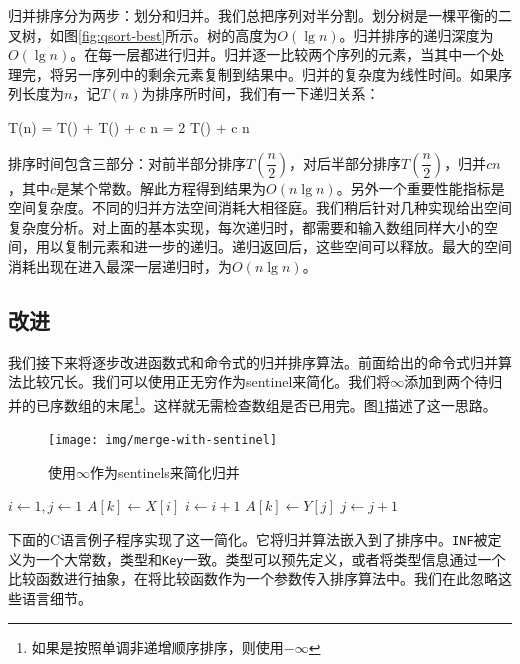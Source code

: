 \documentclass[b5paper]{ctexart}
\begin{document}
归并排序分为两步：划分和归并。我们总把序列对半分割。划分树是一棵平衡的二叉树，如图\ref{fig:qsort-best}所示。树的高度为$O(\lg n)$。归并排序的递归深度为$O(\lg n)$。在每一层都进行归并。归并逐一比较两个序列的元素，当其中一个处理完，将另一序列中的剩余元素复制到结果中。归并的复杂度为线性时间。如果序列长度为$n$，记$T(n)$为排序所时间，我们有一下递归关系：

\be
T(n) = T() + T() + c n = 2 T() + c n
\ee

排序时间包含三部分：对前半部分排序$T(\dfrac{n}{2})$，对后半部分排序$T(\dfrac{n}{2})$，归并$c n$，其中$c$是某个常数。解此方程得到结果为$O(n \lg n)$。另外一个重要性能指标是空间复杂度。不同的归并方法空间消耗大相径庭。我们稍后针对几种实现给出空间复杂度分析。对上面的基本实现，每次递归时，都需要和输入数组同样大小的空间，用以复制元素和进一步的递归。递归返回后，这些空间可以释放。最大的空间消耗出现在进入最深一层递归时，为$O(n \lg n)$。

\subsection{改进}

我们接下来将逐步改进函数式和命令式的归并排序算法。前面给出的命令式归并算法比较冗长。我们可以使用正无穷作为sentinel来简化\cite{CLRS}。我们将$\infty$添加到两个待归并的已序数组的末尾\footnote{如果是按照单调非递增顺序排序，则使用$-\infty$}。这样就无需检查数组是否已用完。图\ref{fig:merge-with-sentinel}描述了这一思路。

\begin{figure}[htbp]
 \centering
 \texttt{[image: img/merge-with-sentinel]}
 \caption{使用$\infty$作为sentinels来简化归并}
 \label{fig:merge-with-sentinel}
\end{figure}

\begin{algorithmic}[1]
  \State {}
  \State {}
  \State $i \gets 1, j\gets 1$
      \State $A[k] \gets X[i]$
      \State $i \gets i + 1$
    \Else
      \State $A[k] \gets Y[j]$
      \State $j \gets j + 1$
    \EndIf
  \EndFor
\EndProcedure
\end{algorithmic}

下面的C语言例子程序实现了这一简化。它将归并算法嵌入到了排序中。\texttt{INF}被定义为一个大常数，类型和\texttt{Key}一致。类型可以预先定义，或者将类型信息通过一个比较函数进行抽象，在将比较函数作为一个参数传入排序算法中。我们在此忽略这些语言细节。
\end{document}
